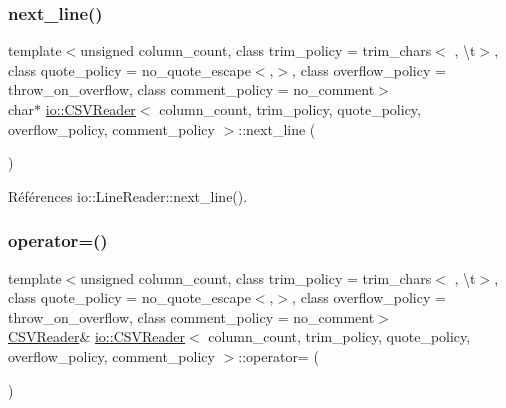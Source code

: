 \mbox{\label{classio_1_1CSVReader_a9fec7797cb27f64360cc48adc5f32c72}} 
\subsubsection{\texorpdfstring{next\+\_\+line()}{next\_line()}}
{\footnotesize\ttfamily template$<$unsigned column\+\_\+count, class trim\+\_\+policy  = trim\+\_\+chars$<$\textquotesingle{} \textquotesingle{}, \textquotesingle{}\textbackslash{}t\textquotesingle{}$>$, class quote\+\_\+policy  = no\+\_\+quote\+\_\+escape$<$\textquotesingle{},\textquotesingle{}$>$, class overflow\+\_\+policy  = throw\+\_\+on\+\_\+overflow, class comment\+\_\+policy  = no\+\_\+comment$>$ \\
char$\ast$ \hyperlink{classio_1_1CSVReader}{io\+::\+C\+S\+V\+Reader}$<$ column\+\_\+count, trim\+\_\+policy, quote\+\_\+policy, overflow\+\_\+policy, comment\+\_\+policy $>$\+::next\+\_\+line (\begin{DoxyParamCaption}{ }\end{DoxyParamCaption})\hspace{0.3cm}{\ttfamily [inline]}}



Références io\+::\+Line\+Reader\+::next\+\_\+line().

\mbox{\label{classio_1_1CSVReader_a37046e6629cf4254037c14440f14141d}} 
\subsubsection{\texorpdfstring{operator=()}{operator=()}}
{\footnotesize\ttfamily template$<$unsigned column\+\_\+count, class trim\+\_\+policy  = trim\+\_\+chars$<$\textquotesingle{} \textquotesingle{}, \textquotesingle{}\textbackslash{}t\textquotesingle{}$>$, class quote\+\_\+policy  = no\+\_\+quote\+\_\+escape$<$\textquotesingle{},\textquotesingle{}$>$, class overflow\+\_\+policy  = throw\+\_\+on\+\_\+overflow, class comment\+\_\+policy  = no\+\_\+comment$>$ \\
\hyperlink{classio_1_1CSVReader}{C\+S\+V\+Reader}\& \hyperlink{classio_1_1CSVReader}{io\+::\+C\+S\+V\+Reader}$<$ column\+\_\+count, trim\+\_\+policy, quote\+\_\+policy, overflow\+\_\+policy, comment\+\_\+policy $>$\+::operator= (\begin{DoxyParamCaption}\item[{const \hyperlink{classio_1_1CSVReader}{C\+S\+V\+Reader}$<$ column\+\_\+count, trim\+\_\+policy, quote\+\_\+policy, overflow\+\_\+policy, comment\+\_\+policy $>$ \&}]{ }\end{DoxyParamCaption})}

